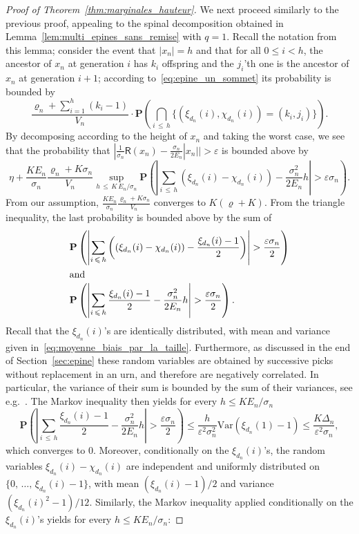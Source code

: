 \documentclass[10pt]{amsart}
\theoremstyle{definition}\newtheorem{defi}[theo]{Definition}\newtheorem{rema}[theo]{Remark}\newtheorem{exam}[theo]{Example}\newtheorem{exem}[theo]{Example}\newtheorem{nota}[theo]{Notation}
\newcommand{\ensembles}[1]{\mathbf{#1}}
\renewcommand{\P}{\ensembles{P}}
\renewcommand{\Pr}[1]{\P\left(#1\right)}
\newcommand{\1}{\ensembles{1}}
\renewcommand{\le}{\leqslant}
\newcommand{\RR}{\mathsf{R}}
\newcommand{\Var}{\mathrm{Var}}
\newcommand{\edges}{E}
\newcommand{\vertices}{V}
\providecommand{\?}{}
\begin{document}
\begin{proof}[Proof of Theorem~\ref{thm:marginales_hauteur}]
We next proceed similarly to the previous proof, appealing to the spinal decomposition obtained in Lemma~\ref{lem:multi_epines_sans_remise} with $q=1$. Recall the notation from this lemma; consider the event that $|x_n| = h$ and that for all $0 \le i < h$, the ancestor of $x_n$ at generation $i$ has $k_i$ offspring and the $j_i$'th one is the ancestor of $x_n$ at generation $i+1$; according to~\eqref{eq:epine_un_sommet} its probability is bounded by
\[
\frac{\varrho_n + \sum\limits_{i=1}^h (k_i - 1)}{\vertices_n}
\cdot \Pr{\bigcap_{i\,\le\,h} \big\{\left(\xi_{d_n}(i), \chi_{d_n}(i)\right) = \left(k_i, j_i\right)\big\}}.
\]
By decomposing according to the height of $x_n$ and taking the worst case, we see that the probability that $|\frac{1}{\sigma_n}\RR(x_n) - \frac{\sigma_n}{2 \edges_n}|x_n|| > \varepsilon$ is bounded above by
\[
\eta +
\frac{K \edges_n}{\sigma_n} \frac{\varrho_n + K \sigma_n}{\vertices_n} \sup_{h\,\le\,K\,\edges_n/\sigma_n}
\Pr{\left|\sum_{i\,\le\,h} \left(\xi_{d_n}(i) - \chi_{d_n}(i)\right) - \frac{\sigma_n^2}{2 \edges_n} h\right| > \varepsilon \sigma_n}.
\]
From our assumption, $\frac{K \edges_n}{\sigma_n} \frac{\varrho_n + K \sigma_n}{\vertices_n}$ converges to $K (\varrho + K)$. From the triangle inequality, the last probability is bounded above by the sum of
\begin{align*}
&\Pr{\left|\sum_{i\,\le\,h} \left(\left(\xi_{d_n}(i) - \chi_{d_n}(i)\right) - \frac{\xi_{d_n}(i) - 1}{2}\right)\right| > \frac{\varepsilon \sigma_n}{2}}
\\
\intertext{and}
&\Pr{\left|\sum_{i\,\le\,h} \frac{\xi_{d_n}(i) - 1}{2} - \frac{\sigma_n^2}{2 \edges_n} h\right| > \frac{\varepsilon \sigma_n}{2}}.
\end{align*}
Recall that the $\xi_{d_n}(i)$'s are identically distributed, with mean and variance given in~\eqref{eq:moyenne_biais_par_la_taille}. Furthermore, as discussed in the end of Section~\ref{sec:epine} these random variables are obtained by successive picks without replacement in an urn, and therefore are negatively correlated. In particular, the variance of their sum is bounded by the sum of their variances, see e.g.~\cite[Proposition~20.6]{Ald85}. The Markov inequality then yields for every $h \le K \edges_n / \sigma_n$
\[
\Pr{\left|\sum_{i\,\le\,h} \frac{\xi_{d_n}(i) - 1}{2} - \frac{\sigma_n^2}{2 \edges_n} h\right| > \frac{\varepsilon \sigma_n}{2}}
\le \frac{h}{\varepsilon^2 \sigma_n^2} \Var\left(\xi_{d_n}(1)-1\right)
\le \frac{K \Delta_n}{\varepsilon^2 \sigma_n},
\]
which converges to $0$. Moreover, conditionally on the $\xi_{d_n}(i)$'s, the random variables $\xi_{d_n}(i) - \chi_{d_n}(i)$ are independent and uniformly distributed on $\{0,\,\dots,\,\xi_{d_n}(i)-1\}$, with mean $(\xi_{d_n}(i) - 1)/2$ and variance $(\xi_{d_n}(i)^2 - 1)/12$. Similarly, the Markov inequality applied conditionally on the $\xi_{d_n}(i)$'s yields for every $h \le K \edges_n / \sigma_n$:


\end{proof}
\end{document}
